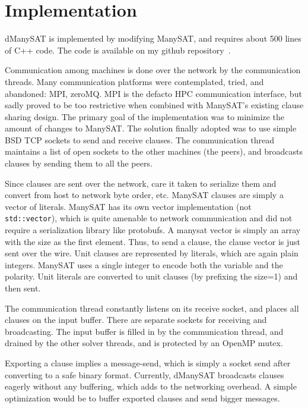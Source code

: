\documentclass{article}
\begin{document}
\section{Implementation}

dManySAT is implemented by modifying ManySAT, and requires about 500
lines of C++ code. The code is available on my github
repository~\cite{github}.

Communication among machines is done over the network by the
communication threads. Many communication platforms were contemplated,
tried, and abandoned: MPI, zeroMQ. MPI is the defacto HPC
communication interface, but sadly proved to be too restrictive when
combined with ManySAT's existing clause sharing design. The primary
goal of the implementation was to minimize the amount of changes to
ManySAT. The solution finally adopted was to use simple BSD TCP
sockets to send and receive clauses. The communication thread
maintains a list of open sockets to the other machines (the peers),
and broadcasts clauses by sending them to all the peers.


Since clauses are sent over the network, care it taken to serialize
them and convert from host to network byte order, etc. ManySAT clauses
are simply a vector of literals. ManySAT has its own vector
implementation (not \texttt{std::vector}), which is quite amenable to
network communication and did not require a serialization library like
protobufs. A manysat vector is simply an array with the size as the
first element. Thus, to send a clause, the clause vector is just sent
over the wire. Unit clauses are represented by literals, which are
again plain integers. ManySAT uses a single integer to encode both the
variable and the polarity. Unit literals are converted to unit clauses
(by prefixing the size=1) and then sent.


The communication thread constantly listens on its receive socket, and
places all clauses on the input buffer. There are separate sockets for
receiving and broadcasting. The input buffer is filled in by the
communication thread, and drained by the other solver threads, and is
protected by an OpenMP mutex. 


Exporting a clause implies a message-send, which is simply a socket
send after converting to a safe binary format. Currently, dManySAT
broadcasts clauses eagerly without any buffering, which adds to the
networking overhead. A simple optimization would be to buffer exported
clauses and send bigger messages.
\end{document}
